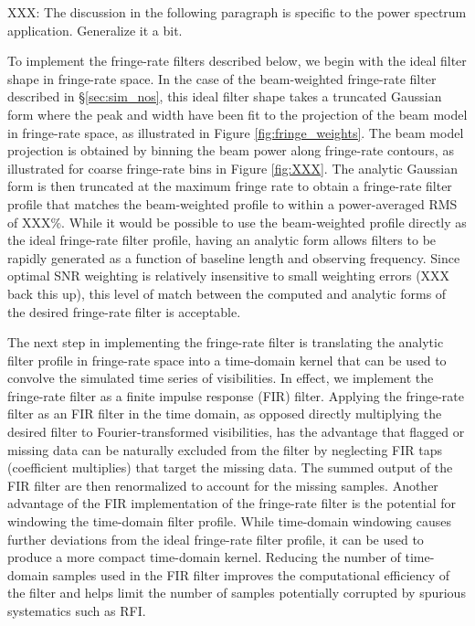 \documentclass[twocolumn,apj,numberedappendix]{emulateapj}
\begin{document}
XXX: The discussion in the following paragraph is specific to the power spectrum application. Generalize it a bit.

To implement
the fringe-rate filters described below, we begin with the ideal filter shape in fringe-rate space.  In the case 
of the beam-weighted fringe-rate filter described in \S\ref{sec:sim_nos}, this ideal filter shape takes a
truncated Gaussian form where the peak and width have been fit to the projection of the beam model in fringe-rate space,
as illustrated in Figure \ref{fig:fringe_weights}.  
The beam model projection is obtained
by binning the beam power along fringe-rate contours, as illustrated for coarse fringe-rate bins
in Figure \ref{fig:XXX}.  The analytic Gaussian form is then truncated at the maximum fringe rate to obtain a fringe-rate
filter profile that matches the beam-weighted profile to within a power-averaged RMS of XXX\%.  While it would be possible
to use the beam-weighted profile directly as the ideal fringe-rate filter profile, having an analytic form allows filters
to be rapidly generated as a function of baseline length and observing frequency.  Since optimal SNR weighting is relatively
insensitive to small weighting errors (XXX back this up), this level of match between the computed and analytic forms of the
desired fringe-rate filter is acceptable.

The next step in implementing the fringe-rate filter is translating the analytic filter profile in fringe-rate space into 
a time-domain kernel that can be used to convolve the simulated time series of visibilities.  In effect, we implement
the fringe-rate filter as a finite impulse response (FIR) filter.  Applying the fringe-rate filter as an FIR filter in
the time domain, as opposed directly multiplying the desired filter to Fourier-transformed visibilities, has the advantage 
that flagged or missing data can be naturally excluded from the filter by neglecting
FIR taps (coefficient multiplies) that target the missing data. The summed output of the FIR filter are then renormalized to
account for the missing samples.  Another advantage of the FIR implementation of the fringe-rate filter is the potential for
windowing the time-domain filter profile.  While time-domain windowing causes further deviations from the ideal
fringe-rate filter profile, it can be used to produce a more compact time-domain kernel.
Reducing the number of time-domain samples used in the FIR filter improves the computational efficiency of the filter and
helps limit the number of samples potentially corrupted by spurious systematics such as RFI.
\end{document}
